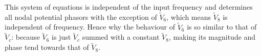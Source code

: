 This system of equations is independent of the input frequency and determines all nodal potential phasors with the exception of $\tilde{V}_6$, which means $\tilde{V}_8$ is independent of frequency. Hence why the behaviour of $\tilde{V}_6$ is so similar to that of $\tilde{V}_c$: because $\tilde{V}_6$ is just $\tilde{V}_c$ summed with a constant $\tilde{V}_8$, making its magnitude and phase tend towards that of $\tilde{V}_8$.




